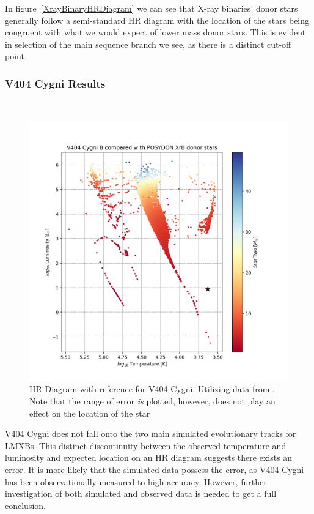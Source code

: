 \documentclass[12pt, a4paper]{article}
\begin{document}
        In figure~\ref{XrayBinaryHRDiagram} we can see that X-ray binaries' donor stars generally follow a semi-standard HR diagram with the location of the stars being congruent with what we would expect of lower mass donor stars. This is evident in selection of the main sequence branch we see, as there is a distinct cut-off point.

        \subsubsection{V404 Cygni Results}~\label{V404Results}
            \begin{figure}[H] 
                \centering
                \includegraphics[scale = .6]{figs/GeneratedFigs/V404_Cygni/V404XBsPopulationHRComp.png}
                \caption{HR Diagram with reference for V404 Cygni. Utilizing data from \parencite{Bartolomeo_2023}. Note that the range of error \textit{is} plotted, however, does not play an effect on the location of the star}
                \label{V404Context}
            \end{figure}

            V404 Cygni does not fall onto the two main simulated evolutionary tracks for LMXBs. This distinct discontinuity between the observed temperature and luminosity and expected location on an HR diagram suggests there exists an error. It is more likely that the simulated data possess the error, as V404 Cygni has been observationally measured to high accuracy. However, further investigation of both simulated and observed data is needed to get a full conclusion. 
\end{document}

